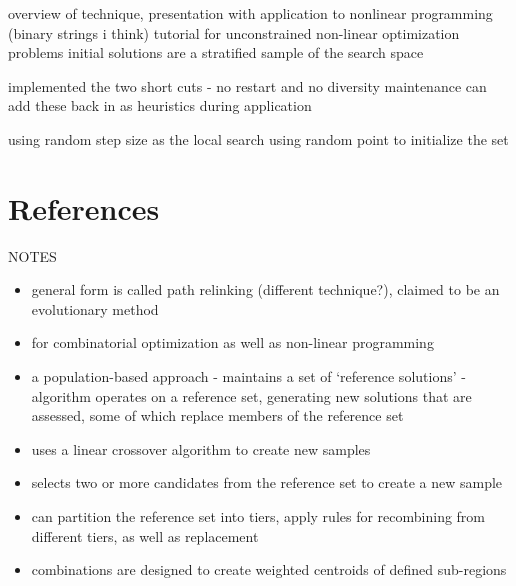 \documentclass[a4paper, 11pt]{article}
\begin{document}
overview of technique, presentation with application to nonlinear programming (binary strings i think) \cite{Glover2003b}
tutorial for unconstrained non-linear optimization problems
initial solutions are a stratified sample of the search space



implemented the two short cuts - no restart and no diversity maintenance
can add these back in as heuristics during application

using random step size as the local search
using random point to initialize the set






\section{References}
\label{sec:references}

NOTES
\begin{itemize}
	\item general form is called path relinking (different technique?), claimed to be an evolutionary method
	\item for combinatorial optimization as well as non-linear programming 
	\item a population-based approach - maintains a set of `reference solutions' - algorithm operates on a reference set, generating new solutions that are assessed, some of which replace members of the reference set
	\item uses a linear crossover algorithm to create new samples
	\item selects two or more candidates from the reference set to create a new sample
	\item can partition the reference set into tiers, apply rules for recombining from different tiers, as well as replacement
	\item combinations are designed to create weighted centroids of defined sub-regions
\end{itemize}
\end{document}
